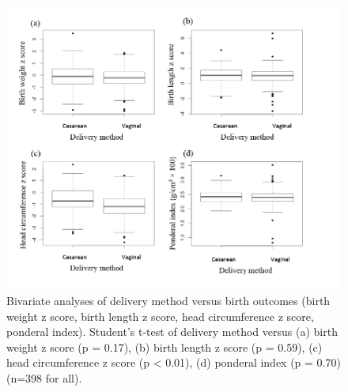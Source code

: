 \begin{figure}
  \centering
    \label{fig:Fig327}
  \includegraphics[scale=1]{Figures/Fig327.pdf}
  \caption[Bivariate analyses of delivery method versus birth outcomes (birth weight z score, birth length z score, head circumference z score, ponderal index)]{Bivariate analyses of delivery method versus birth outcomes (birth weight z score, birth length z score, head circumference z score, ponderal index). Student's t-test of delivery method versus (a) birth weight z score (p = 0.17), (b) birth length z score (p = 0.59), (c) head circumference z score (p < 0.01), (d) ponderal index (p = 0.70) (n=398 for all).}
\end{figure}

